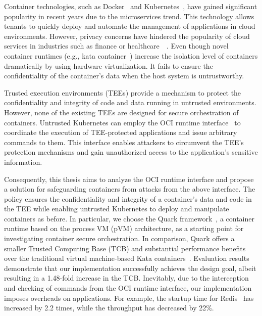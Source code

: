 




Container technologies, such as Docker~\cite*{docker} and Kubernetes~\cite*{k8s}, have gained significant popularity in recent years due to the microservices trend. This technology allows tenants to quickly deploy and automate the management of applications in cloud environments. However, privacy concerns 
have hindered the popularity of cloud services in industries such as finance or healthcare~\cite*{data_privacy}~\cite*{eu_data_Privacy}. Even though novel container runtimes (e.g., kata container~\cite*{Kata-Containers}) increase the isolation level of containers dramatically by using hardware virtualization. 
It fails to ensure the confidentiality of the container's data when the host system is untrustworthy.

Trusted execution environments (\acrshort{TEE}s) provide a mechanism to protect the confidentiality and integrity of code and data running in untrusted environments. However, none of the existing TEEs are designed for secure orchestration of containers. Untrusted Kubernetes can employ the OCI runtime interface~\cite*{oci-runtime-spec} to coordinate the execution of 
TEE-protected applications and issue arbitrary commands to them. This interface enables attackers to circumvent the TEE's protection mechanisms and gain unauthorized access to the application's sensitive information.

Consequently, this thesis aims to analyze the OCI runtime interface and propose a solution for safeguarding containers from attacks from the above interface. The policy ensures the confidentiality and integrity of a container's data and code in the TEE while enabling untrusted Kubernetes\cite*{k8s} to deploy and manipulate containers as 
before. In particular, we choose the Quark framework~\cite*{quark}, a container runtime based on the process VM (\acrshort{pVM}) architecture, as a starting point for investigating container secure orchestration. In comparison, Quark offers a smaller Trusted Computing Base (\acrshort{TCB}) and substantial performance 
benefits over the traditional virtual machine-based Kata containers~\cite*{quark_performance_report}. Evaluation results demonstrate that our implementation successfully achieves the design goal, albeit resulting in a 1.48-fold increase in the \acrshort{TCB}. Inevitably, due to the interception and 
checking of commands from the OCI runtime interface, our implementation imposes overheads on applications.  For example, the startup time for Redis~\cite*{redis} has increased by 2.2 times, while the throughput has decreased by 22\%.


